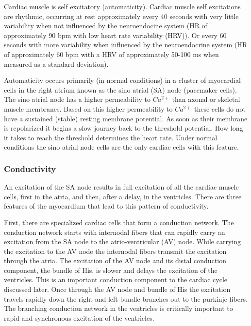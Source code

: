 Cardiac muscle is self excitatory (automaticity). Cardiac muscle self excitations are rhythmic, occurring at rest approximately every 40 seconds with very little variability when not influenced by the neuroendocine system (HR of approximately 90 bpm with low heart rate variability (HRV)). Or every 60 seconds with more variability when influenced by the neuroendocrine system (HR of approximately 60 bpm with a HRV of approximately 50-100 ms when measured as a standard deviation).

Automaticity occurs primarily (in normal conditions) in a cluster of myocardial cells in the right atrium known as the sino atrial (SA) node (pacemaker cells). The sino atrial node has a higher permeability to $Ca^{2+}$ than axonal or skeletal muscle membranes. Based on this higher permeability to $Ca^{2+}$ these cells do not have a sustained (stable) resting membrane potential. As soon as their membrane is repolarized it begins a slow journey back to the threshold potential. How long it takes to reach the threshold determines the heart rate. Under normal conditions the sino atrial node cells are the only cardiac cells with this feature. 

\subsubsection{Conductivity} 

An excitation of the SA node results in full excitation of all the cardiac muscle cells, first in the atria, and then, after a delay, in the ventricles. There are three features of the myocardium that lead to this pattern of conductivity. 


First, there are specialized cardiac cells that form a conduction network. The conduction network starts with internodal fibers that can rapidly carry an excitation from the SA node to the atrio-ventricular (AV) node. While carrying the excitation to the AV node the internodal fibers transmit the excitation through the atria. The excitation of the AV node and its distal conduction component, the bundle of His, is slower and delays the excitation of the ventricles. This is an important conduction component to the cardiac cycle discussed later. Once through the AV node and bundle of His the excitation travels rapidly down the right and left bundle branches out to the purkinje fibers. The branching conduction network in the ventricles is critically important to rapid and synchronous excitation of the ventricles. 

